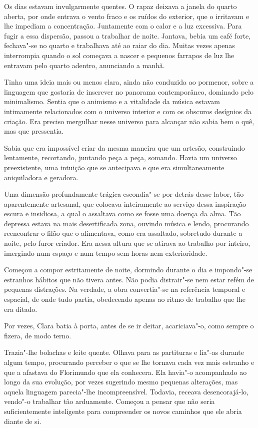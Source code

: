 Os dias estavam invulgarmente quentes. O rapaz deixava a janela do
quarto aberta, por onde entrava o vento fraco e os ruídos do exterior,
que o irritavam e lhe impediam a concentração. Juntamente com o calor e
a luz excessiva. Para fugir a essa dispersão, passou a trabalhar de
noite. Jantava, bebia um café forte, fechava"-se no quarto e trabalhava
até ao raiar do dia. Muitas vezes apenas interrompia quando o sol
começava a nascer e pequenos farrapos de luz lhe entravam pelo quarto
adentro, anunciando a manhã.

Tinha uma ideia mais ou menos clara, ainda não conduzida ao pormenor,
sobre a linguagem que gostaria de inscrever no panorama contemporâneo,
dominado pelo minimalismo. Sentia que o animismo e a vitalidade da
música estavam intimamente relacionados com o universo interior e com os
obscuros desígnios da criação. Era preciso mergulhar nesse universo para
alcançar não sabia bem o quê, mas que pressentia.

Sabia que era impossível criar da mesma maneira que um artesão,
construindo lentamente, recortando, juntando peça a peça, somando. Havia
um universo preexistente, uma intuição que se antecipava e que era
simultaneamente aniquiladora e geradora.

Uma dimensão profundamente trágica escondia"-se por detrás desse labor,
tão aparentemente artesanal, que colocava inteiramente ao serviço dessa
inspiração escura e insidiosa, a qual o assaltava como se fosse uma
doença da alma. Tão depressa estava na mais desertificada zona, ouvindo
música e lendo, procurando reencontrar o filão que o alimentava, como
era assaltado, sobretudo durante a noite, pelo furor criador. Era nessa
altura que se atirava ao trabalho por inteiro, imergindo num espaço e
num tempo sem horas nem exterioridade.

Começou a compor estritamente de noite, dormindo durante o dia e
impondo"-se estranhos hábitos que não tivera antes. Não podia distrair"-se
nem estar refém de pequenas distrações. Na verdade, a obra convertia"-se
na referência temporal e espacial, de onde tudo partia, obedecendo
apenas ao ritmo de trabalho que lhe era ditado.

Por vezes, Clara batia à porta, antes de se ir deitar, acariciava"-o,
como sempre o fizera, de modo terno.

Trazia"-lhe bolachas e leite quente. Olhava para as partituras e lia"-as
durante algum tempo, procurando perceber o que se lhe tornava cada vez
mais estranho e que a afastava do Florimundo que ela conhecera. Ela
havia"-o acompanhado ao longo da sua evolução, por vezes sugerindo mesmo
pequenas alterações, mas aquela linguagem parecia"-lhe incompreensível.
Todavia, receava desencorajá-lo, vendo"-o trabalhar tão arduamente.
Começou a pensar que não seria suficientemente inteligente para
compreender os novos caminhos que ele abria diante de si.

